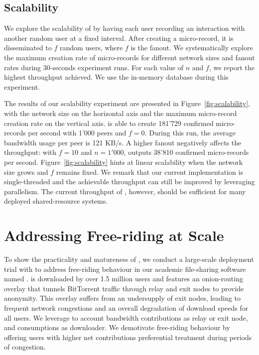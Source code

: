 \subsection{Scalability}
We explore the scalability of \ModelName{} by having each user recording an interaction with another random user at a fixed interval.
After creating a micro-record, it is disseminated to $ f $ random users, where $ f $ is the fanout.
We systematically explore the maximum creation rate of micro-records for different network sizes and fanout rates during 30-seconds experiment runs.
For each value of $ n $ and $ f $, we report the highest throughput achieved.
We use the in-memory database during this experiment.

The results of our scalability experiment are presented in Figure~\ref{fig:scalability}, with the network size on the horizontal axis and the maximum micro-record creation rate on the vertical axis.
\ModelName{} is able to create 181'729 confirmed micro-records per second with 1'000 peers and $ f = 0 $.
During this run, the average bandwidth usage per peer is 121 KB/s.
A higher fanout negatively affects the throughput: with $ f = 10 $ and $ n = 1'000 $, \ModelName{} outputs 38'810 confirmed micro-records per second.
Figure~\ref{fig:scalability} hints at linear scalability when the network size grows and $ f $ remains fixed.
We remark that our current implementation is single-threaded and the achievable throughput can still be improved by leveraging parallelism.
The current throughput of \ModelName{}, however, should be sufficient for many deployed shared-resource systems.

\section{Addressing Free-riding at Scale}
\label{sec:deployment}
To show the practicality and matureness of \ModelName{}, we conduct a large-scale deployment trial with to address free-riding behaviour in our academic file-sharing software named \Tribler{}.
\Tribler{} is downloaded by over 1.5 million users and features an onion-routing overlay that tunnels BitTorrent traffic through relay and exit nodes to provide anonymity.
This overlay suffers from an undersupply of exit nodes, leading to frequent network congestions and an overall degradation of download speeds for all users.
We leverage \ModelName{} to account bandwidth contributions as relay or exit node, and consumptions as downloader.
We demotivate free-riding behaviour by offering users with higher net contributions preferential treatment during periods of congestion.

